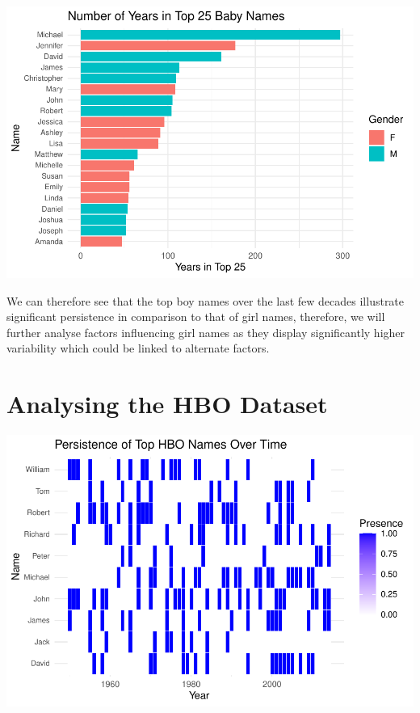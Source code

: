 \documentclass[11pt,preprint, authoryear]{elsarticle}
\let\origfigure\figure
\let\endorigfigure\endfigure
\renewenvironment{figure}[1][2] {
    \expandafter\origfigure\expandafter[H]
} {
    \endorigfigure
}
\numberwithin{equation}{section}
\numberwithin{figure}{section}
\numberwithin{table}{section}
\begin{document}
\begin{figure}

{\centering \includegraphics{README_files/figure-latex/unnamed-chunk-4-1} 

}

\caption{The Number of Years the Top 25 Baby Names Persisted Over Time for both Genders\label{Figure4}}\label{fig:unnamed-chunk-4}
\end{figure}

We can therefore see that the top boy names over the last few decades
illustrate significant persistence in comparison to that of girl names,
therefore, we will further analyse factors influencing girl names as
they display significantly higher variability which could be linked to
alternate factors.

\hypertarget{analysing-the-hbo-dataset}{%
\section{Analysing the HBO Dataset}\label{analysing-the-hbo-dataset}}

\begin{figure}

{\centering \includegraphics{README_files/figure-latex/unnamed-chunk-5-1} 

}

\caption{The Persistence of HBO names in the top rankings over time\label{Figure5}}\label{fig:unnamed-chunk-5}
\end{figure}
\end{document}

